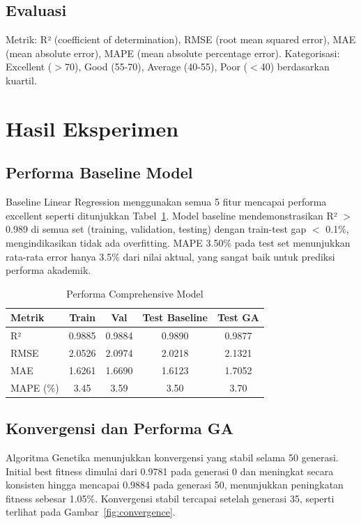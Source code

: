 \documentclass[conference]{IEEEtran}
\begin{document}
\subsection{Evaluasi}
Metrik: R² (coefficient of determination), RMSE (root mean squared error), MAE (mean absolute error), MAPE (mean absolute percentage error). Kategorisasi: Excellent ($>$70), Good (55-70), Average (40-55), Poor ($<$40) berdasarkan kuartil.

\section{Hasil Eksperimen}

\subsection{Performa Baseline Model}

Baseline Linear Regression menggunakan semua 5 fitur mencapai performa excellent seperti ditunjukkan Tabel~\ref{tab:results}. Model baseline mendemonstrasikan R² $>$ 0.989 di semua set (training, validation, testing) dengan train-test gap $<$ 0.1\%, mengindikasikan tidak ada overfitting. MAPE 3.50\% pada test set menunjukkan rata-rata error hanya 3.5\% dari nilai aktual, yang sangat baik untuk prediksi performa akademik.

\begin{table}[htbp]
\caption{Performa Comprehensive Model}
\begin{center}
\begin{tabular}{|l|c|c|c|c|}
\hline
\textbf{Metrik} & \textbf{Train} & \textbf{Val} & \textbf{Test Baseline} & \textbf{Test GA} \\
\hline
R² & 0.9885 & 0.9884 & 0.9890 & 0.9877 \\
RMSE & 2.0526 & 2.0974 & 2.0218 & 2.1321 \\
MAE & 1.6261 & 1.6690 & 1.6123 & 1.7052 \\
MAPE (\%) & 3.45 & 3.59 & 3.50 & 3.70 \\
\hline
\end{tabular}
\label{tab:results}
\end{center}
\end{table}

\subsection{Konvergensi dan Performa GA}

Algoritma Genetika menunjukkan konvergensi yang stabil selama 50 generasi. Initial best fitness dimulai dari 0.9781 pada generasi 0 dan meningkat secara konsisten hingga mencapai 0.9884 pada generasi 50, menunjukkan peningkatan fitness sebesar 1.05\%. Konvergensi stabil tercapai setelah generasi 35, seperti terlihat pada Gambar~\ref{fig:convergence}.
\end{document}
